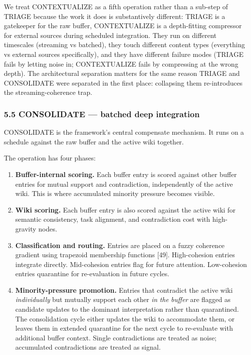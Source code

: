 \documentclass[
  11pt,
]{article}
\providecommand{\tightlist}{%
  \setlength{\itemsep}{0pt}\setlength{\parskip}{0pt}}
\begin{document}
We treat CONTEXTUALIZE as a fifth operation rather than a sub-step of
TRIAGE because the work it does is substantively different: TRIAGE is a
gatekeeper for the raw buffer, CONTEXTUALIZE is a depth-fitting
compressor for external sources during scheduled integration. They run
on different timescales (streaming vs batched), they touch different
content types (everything vs external sources specifically), and they
have different failure modes (TRIAGE fails by letting noise in;
CONTEXTUALIZE fails by compressing at the wrong depth). The
architectural separation matters for the same reason TRIAGE and
CONSOLIDATE were separated in the first place: collapsing them
re-introduces the streaming-coherence trap.

\hypertarget{consolidate-batched-deep-integration}{%
\subsubsection{5.5 CONSOLIDATE --- batched deep
integration}\label{consolidate-batched-deep-integration}}

CONSOLIDATE is the framework's central compensate mechanism. It runs on
a schedule against the raw buffer and the active wiki together.

The operation has four phases:

\begin{enumerate}
\def\labelenumi{\arabic{enumi}.}
\tightlist
\item
  \textbf{Buffer-internal scoring.} Each buffer entry is scored against
  other buffer entries for mutual support and contradiction,
  independently of the active wiki. This is where accumulated minority
  pressure becomes visible.
\item
  \textbf{Wiki scoring.} Each buffer entry is also scored against the
  active wiki for semantic consistency, task alignment, and
  contradiction cost with high-gravity nodes.
\item
  \textbf{Classification and routing.} Entries are placed on a fuzzy
  coherence gradient using trapezoid membership functions {[}49{]}.
  High-cohesion entries integrate directly. Mid-cohesion entries flag
  for future attention. Low-cohesion entries quarantine for
  re-evaluation in future cycles.
\item
  \textbf{Minority-pressure promotion.} Entries that contradict the
  active wiki \emph{individually} but mutually support each other
  \emph{in the buffer} are flagged as candidate updates to the dominant
  interpretation rather than quarantined. The consolidation cycle either
  updates the wiki to accommodate them, or leaves them in extended
  quarantine for the next cycle to re-evaluate with additional buffer
  context. Single contradictions are treated as noise; accumulated
  contradictions are treated as signal.
\end{enumerate}
\end{document}
